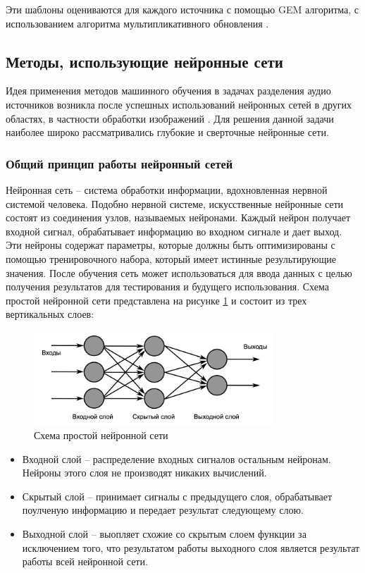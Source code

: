 Эти шаблоны оцениваются для каждого источника с помощью GEM алгоритма, с использованием алгоритма мультипликативного обновления \cite{DLee}.

\subsection{Методы, использующие нейронные сети}

Идея применения методов машинного обучения в задачах разделения аудио источников возникла после успешных использований нейронных сетей в других областях, в частности обработки изображений \cite{[Krizhevsky}. Для решения данной задачи наиболее широко рассматривались глубокие\cite{[Grais} и сверточные\cite{[Chandna} нейронные сети.

\subsubsection{Общий принцип работы нейронный сетей}

Нейронная сеть -- система обработки информации, вдохновленная нервной системой человека\cite{Grossberg}. Подобно нервной системе, искусственные нейронные сети состоят из соединения узлов, называемых нейронами. Каждый нейрон получает входной сигнал, обрабатывает информацию во входном сигнале и дает выход. Эти нейроны содержат параметры, которые должны быть оптимизированы с помощью тренировочного набора, который имеет истинные результирующие значения. После обучения сеть может использоваться для ввода данных с целью получения результатов для тестирования и будущего использования. Схема простой нейронной сети представлена на рисунке \ref{anal:simple-nn} и состоит из трех вертикальных слоев:

\begin{figure}
	\centering
	\includegraphics[width=0.8\textwidth]{inc/img/simple-nn.png}
	\caption{Схема простой нейронной сети}
	\label{anal:simple-nn}
\end{figure}

\begin{itemize}
	\item Входной слой -- распределение входных сигналов остальным нейронам. Нейроны этого слоя не производят никаких вычислений.
	\item Скрытый слой -- принимает сигналы с предыдущего слоя, обрабатывает поулченую информацию и передает результат следующему слою.
	\item Выходной слой -- выопляет схожие со скрытым слоем функции за исключением того, что результатом работы выходного слоя является результат работы всей нейронной сети.
\end{itemize}

